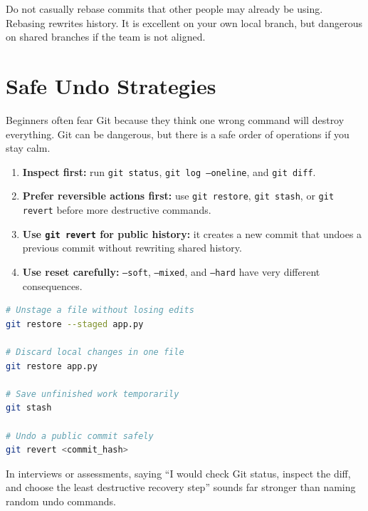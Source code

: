 \documentclass[12pt, a4paper, oneside]{book}
\begin{document}
\begin{warningbox}
Do not casually rebase commits that other people may already be using. Rebasing rewrites history. It is excellent on your own local branch, but dangerous on shared branches if the team is not aligned.
\end{warningbox}

\section{Safe Undo Strategies}

Beginners often fear Git because they think one wrong command will destroy everything. Git can be dangerous, but there is a safe order of operations if you stay calm.

\begin{enumerate}[leftmargin=2em]
    \item \textbf{Inspect first:} run \texttt{git status}, \texttt{git log --oneline}, and \texttt{git diff}.
    \item \textbf{Prefer reversible actions first:} use \texttt{git restore}, \texttt{git stash}, or \texttt{git revert} before more destructive commands.
    \item \textbf{Use \texttt{git revert} for public history:} it creates a new commit that undoes a previous commit without rewriting shared history.
    \item \textbf{Use reset carefully:} \texttt{--soft}, \texttt{--mixed}, and \texttt{--hard} have very different consequences.
\end{enumerate}

\begin{lstlisting}[language=bash, caption={Safer ways to recover from common mistakes}]
# Unstage a file without losing edits
git restore --staged app.py

# Discard local changes in one file
git restore app.py

# Save unfinished work temporarily
git stash

# Undo a public commit safely
git revert <commit_hash>
\end{lstlisting}

\begin{examtipbox}
In interviews or assessments, saying ``I would check Git status, inspect the diff, and choose the least destructive recovery step'' sounds far stronger than naming random undo commands.
\end{examtipbox}
\end{document}
